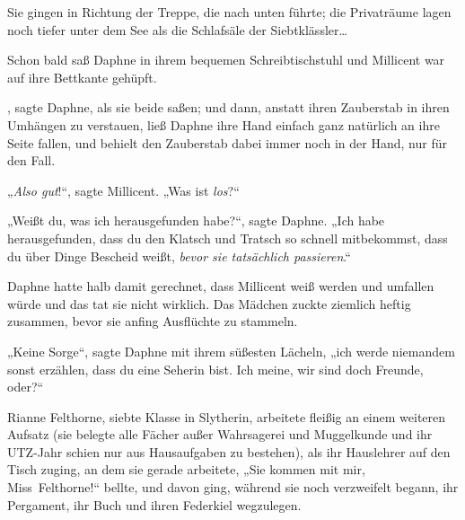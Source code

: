 Sie gingen in Richtung der Treppe, die nach unten führte; die Privaträume lagen noch tiefer unter dem See als die Schlafsäle der Siebtklässler…

Schon bald saß Daphne in ihrem bequemen Schreibtischstuhl und Millicent war auf ihre Bettkante gehüpft.

, sagte Daphne, als sie beide saßen; und dann, anstatt ihren Zauberstab in ihren Umhängen zu verstauen, ließ Daphne ihre Hand einfach ganz natürlich an ihre Seite fallen, und behielt den Zauberstab dabei immer noch in der Hand, nur für den Fall.

„\emph{Also gut}!“, sagte Millicent. „Was ist \emph{los}?“

„Weißt du, was ich herausgefunden habe?“, sagte Daphne. „Ich habe herausgefunden, dass du den Klatsch und Tratsch so schnell mitbekommst, dass du über Dinge Bescheid weißt, \emph{bevor sie tatsächlich passieren}.“

Daphne hatte halb damit gerechnet, dass Millicent weiß werden und umfallen würde und das tat sie nicht wirklich. Das Mädchen zuckte ziemlich heftig zusammen, bevor sie anfing Ausflüchte zu stammeln.

„Keine Sorge“, sagte Daphne mit ihrem süßesten Lächeln, „ich werde niemandem sonst erzählen, dass du eine Seherin bist. Ich meine, wir sind doch Freunde, oder?“

\later

Rianne Felthorne, siebte Klasse in Slytherin, arbeitete fleißig an einem weiteren Aufsatz (sie belegte alle Fächer außer Wahrsagerei und Muggelkunde und ihr UTZ-Jahr schien nur aus Hausaufgaben zu bestehen), als ihr Hauslehrer auf den Tisch zuging, an dem sie gerade arbeitete, „Sie kommen mit mir, Miss~Felthorne!“ bellte, und davon ging, während sie noch verzweifelt begann, ihr Pergament, ihr Buch und ihren Federkiel wegzulegen.

